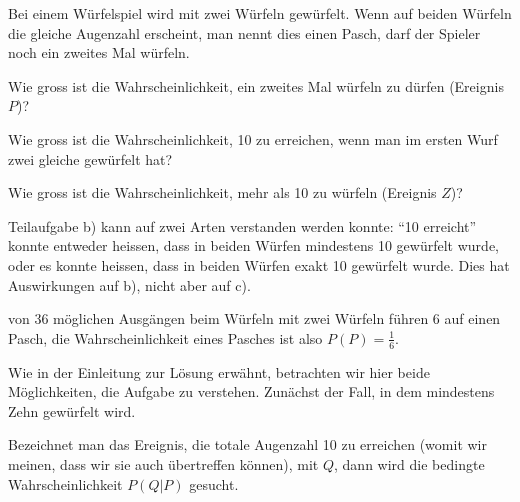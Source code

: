 Bei einem Würfelspiel wird mit zwei Würfeln gewürfelt. Wenn
auf beiden Würfeln die gleiche Augenzahl erscheint, man nennt dies
einen Pasch, darf
der Spieler noch ein zweites Mal würfeln.
\begin{teilaufgaben}
\item Wie gross ist die Wahrscheinlichkeit, ein zweites Mal würfeln
zu dürfen (Ereignis $P$)?
\item Wie gross ist die Wahrscheinlichkeit, 10 zu erreichen,
wenn man im ersten Wurf zwei gleiche gewürfelt hat?
\item Wie gross ist die
Wahrscheinlichkeit, mehr als 10 zu würfeln (Ereignis $Z$)?
\end{teilaufgaben}

\begin{loesung}
Teilaufgabe b) kann auf zwei
Arten verstanden werden konnte: ``10 erreicht'' konnte
entweder heissen, dass in beiden Würfen mindestens 10 gewürfelt wurde,
oder es konnte heissen, dass in beiden Würfen exakt 10 gewürfelt wurde.
Dies hat Auswirkungen auf b), nicht aber auf c).

\begin{teilaufgaben}
\item von 36 möglichen Ausgängen beim Würfeln mit zwei Würfeln
führen 6 auf einen Pasch, die Wahrscheinlichkeit eines Pasches
ist also $P(P)=\frac16$.
\item
Wie in der Einleitung zur Lösung erwähnt, betrachten wir hier beide
Möglichkeiten, die Aufgabe zu verstehen. Zunächst der Fall, in
dem mindestens Zehn gewürfelt wird.

Bezeichnet man das Ereignis, die totale Augenzahl 10 zu erreichen (womit
wir meinen, dass wir sie auch übertreffen können), mit
$Q$, dann wird die bedingte Wahrscheinlichkeit $P(Q|P)$ gesucht.


\end{teilaufgaben}
\end{loesung}
